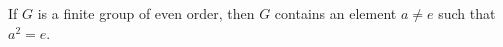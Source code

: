 If \(G\) is a finite group of even order, then \(G\) contains an element \(a\ne e\) such that \(a^2 = e\).
